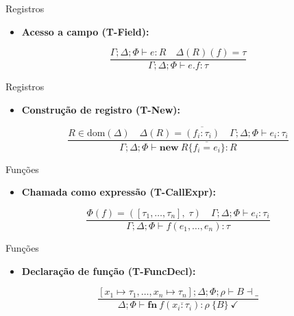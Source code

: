 \begin{frame}{Registros}

    \begin{itemize}

        \item
        \textbf{Acesso a campo (T-Field):}
    \end{itemize}

    \[\frac{\Gamma;\Delta;\Phi \vdash e : R \quad \Delta(R)(f) = \tau}{\Gamma;\Delta;\Phi \vdash e.f : \tau}\]
\end{frame}

\begin{frame}{Registros}

    \begin{itemize}

        \item
        \textbf{Construção de registro (T-New):}
    \end{itemize}

    \[\frac{R \in \mathrm{dom}(\Delta) \quad \Delta(R) = \overline{(f_i:\tau_i)} \quad \Gamma;\Delta;\Phi \vdash e_i : \tau_i}{\Gamma;\Delta;\Phi \vdash \mathbf{new}\ R\{\overline{f_i=e_i}\} : R}\]
\end{frame}

\begin{frame}{Funções}

    \begin{itemize}

        \item
        \textbf{Chamada como expressão (T-CallExpr):}
    \end{itemize}

    \[\frac{\Phi(f) = ([\tau_1,\ldots,\tau_n],\;\tau) \quad \Gamma;\Delta;\Phi \vdash e_i : \tau_i}{\Gamma;\Delta;\Phi \vdash f(e_1,\ldots,e_n) : \tau}\]
\end{frame}

\begin{frame}{Funções}

    \begin{itemize}

        \item
        \textbf{Declaração de função (T-FuncDecl):}
    \end{itemize}

    \[\frac{[x_1\!\mapsto\!\tau_1,\ldots,x_n\!\mapsto\!\tau_n];\Delta;\Phi;\rho \vdash B \dashv \_}{\Delta;\Phi \vdash \mathbf{fn}\ f(\overline{x_i:\tau_i}):\rho\ \{B\}\ \checkmark}\]
\end{frame}


